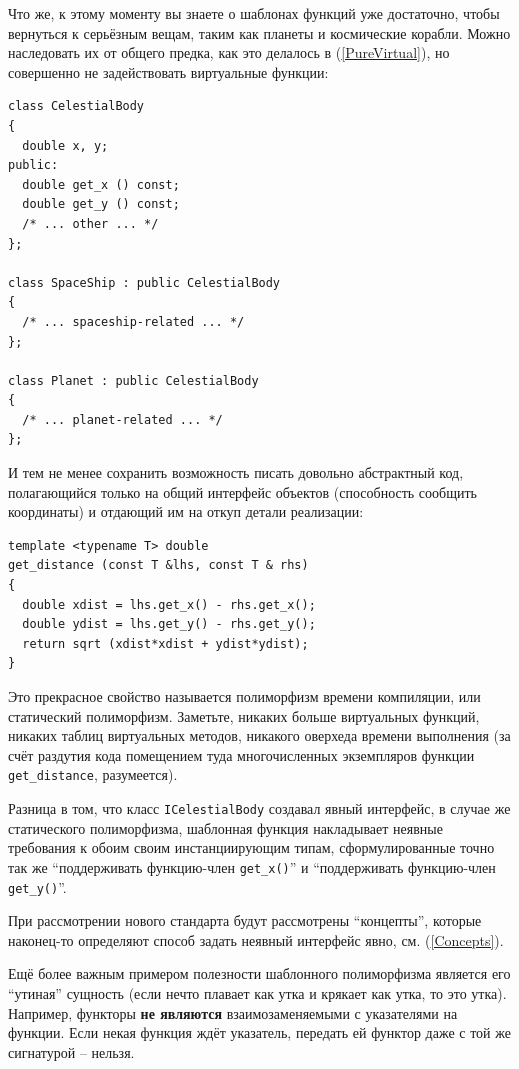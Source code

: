 \documentclass[a4paper,12pt,oneside]{article}
\begin{document}
Что же, к этому моменту вы знаете о шаблонах функций уже достаточно, чтобы вернуться к серьёзным вещам, таким как планеты и космические корабли. Можно наследовать их от общего предка, как это делалось в (\ref{PureVirtual}), но совершенно не задействовать виртуальные функции:

\begin{lstlisting}
class CelestialBody
{
  double x, y;
public:
  double get_x () const;
  double get_y () const;
  /* ... other ... */ 
};

class SpaceShip : public CelestialBody
{
  /* ... spaceship-related ... */
};

class Planet : public CelestialBody
{
  /* ... planet-related ... */
};
\end{lstlisting}

И тем не менее сохранить возможность писать довольно абстрактный код, полагающийся только на общий интерфейс объектов (способность сообщить координаты) и отдающий им на откуп детали реализации:

\begin{lstlisting}
template <typename T> double
get_distance (const T &lhs, const T & rhs)
{
  double xdist = lhs.get_x() - rhs.get_x();
  double ydist = lhs.get_y() - rhs.get_y();
  return sqrt (xdist*xdist + ydist*ydist);
}
\end{lstlisting}

Это прекрасное свойство называется полиморфизм времени компиляции, или статический полиморфизм. Заметьте, никаких больше виртуальных функций, никаких таблиц виртуальных методов, никакого оверхеда времени выполнения (за счёт раздутия кода помещением туда многочисленных экземпляров функции \lstinline!get_distance!, разумеется).

Разница в том, что класс \lstinline!ICelestialBody! создавал явный интерфейс, в случае же статического полиморфизма, шаблонная функция накладывает неявные требования к обоим своим инстанциирующим типам, сформулированные точно так же ``поддерживать функцию-член \lstinline!get_x()!'' и ``поддерживать функцию-член \lstinline!get_y()!''. 

При рассмотрении нового стандарта будут рассмотрены ``концепты'', которые наконец-то определяют способ задать неявный интерфейс явно, см. (\ref{Concepts}).

Ещё более важным примером полезности шаблонного полиморфизма является его ``утиная'' сущность (если нечто плавает как утка и крякает как утка, то это утка). Например, функторы \textbf{не являются} взаимозаменяемыми с указателями на функции. Если некая функция ждёт указатель, передать ей функтор даже с той же сигнатурой -- нельзя. 
\end{document}
